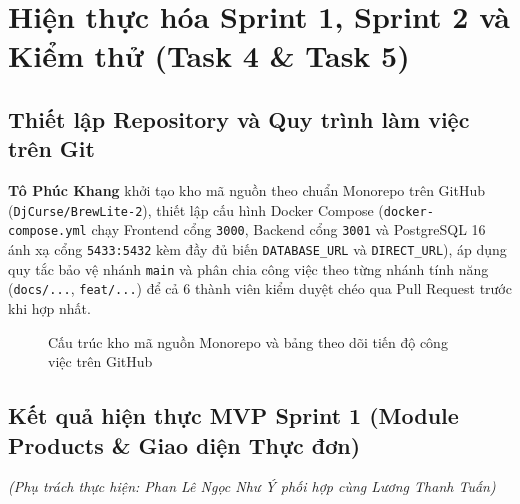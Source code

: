 \section{Hiện thực hóa Sprint 1, Sprint 2 và Kiểm thử (Task 4 \& Task 5)}

\subsection{Thiết lập Repository và Quy trình làm việc trên Git}
\textbf{Tô Phúc Khang} khởi tạo kho mã nguồn theo chuẩn Monorepo trên GitHub (\texttt{DjCurse/BrewLite-2}), thiết lập cấu hình Docker Compose (\texttt{docker-compose.yml} chạy Frontend cổng \texttt{3000}, Backend cổng \texttt{3001} và PostgreSQL 16 ánh xạ cổng \texttt{5433:5432} kèm đầy đủ biến \texttt{DATABASE\_URL} và \texttt{DIRECT\_URL}), áp dụng quy tắc bảo vệ nhánh \texttt{main} và phân chia công việc theo từng nhánh tính năng (\texttt{docs/...}, \texttt{feat/...}) để cả 6 thành viên kiểm duyệt chéo qua Pull Request trước khi hợp nhất.

\begin{figure}[H]
\centering
{}
\caption{Cấu trúc kho mã nguồn Monorepo và bảng theo dõi tiến độ công việc trên GitHub}
\end{figure}

\subsection{Kết quả hiện thực MVP Sprint 1 (Module Products \& Giao diện Thực đơn)}
\textit{(Phụ trách thực hiện: Phan Lê Ngọc Như Ý phối hợp cùng Lương Thanh Tuấn)}

